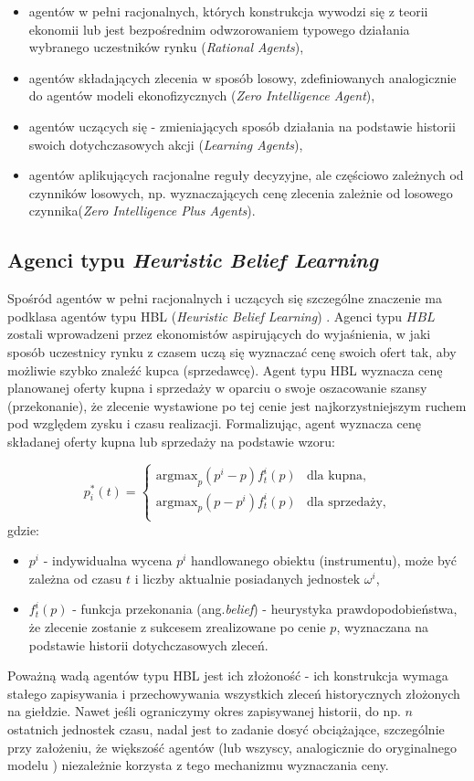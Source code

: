 {\begin{itemize} 
\item agentów w pełni racjonalnych, których konstrukcja wywodzi się z teorii ekonomii lub jest bezpośrednim odwzorowaniem typowego działania wybranego uczestników rynku (\textit{Rational Agents}),
\item agentów składających zlecenia w sposób losowy, zdefiniowanych analogicznie do agentów modeli ekonofizycznych (\textit{Zero Intelligence Agent}),
\item agentów uczących się - zmieniających sposób działania na podstawie historii swoich dotychczasowych akcji (\textit{Learning Agents}), 
\item agentów aplikujących racjonalne reguły decyzyjne, ale częściowo zależnych od czynników losowych, np. wyznaczających cenę zlecenia zależnie od losowego czynnika(\textit{Zero Intelligence Plus Agents}).
\end{itemize} 
\subsection{Agenci typu \textit{Heuristic Belief Learning}}
Spośród agentów w pełni racjonalnych i uczących się szczególne znaczenie ma podklasa agentów typu HBL (\textit{Heuristic Belief Learning}) \cite{hblagent}. Agenci typu $HBL$ zostali wprowadzeni przez ekonomistów aspirujących do wyjaśnienia, w jaki sposób uczestnicy rynku z czasem uczą się wyznaczać cenę swoich ofert tak, aby możliwie szybko znaleźć kupca (sprzedawcę). Agent typu HBL wyznacza cenę planowanej oferty kupna i sprzedaży w oparciu o swoje oszacowanie szansy (przekonanie), że zlecenie wystawione po tej cenie jest najkorzystniejszym ruchem pod względem zysku i czasu realizacji. Formalizując, agent wyznacza cenę składanej oferty kupna lub sprzedaży na podstawie wzoru: 

$$p^*_i(t)= \left\{\begin{array}{lr}
        \mathrm{argmax}_p (p^i-p)f^i_t(p)& \text{dla kupna,}\\
        \mathrm{argmax}_p (p-p^i)f^i_t(p)& \text{dla sprzedaży,}\\
        \end{array}$$
gdzie:
\begin{itemize}
\item $p^i$ - indywidualna wycena $p^i$ handlowanego obiektu (instrumentu), może być zależna od czasu $t$ i liczby aktualnie posiadanych jednostek $\omega^i$, 
\item $f^i_t(p)$ - funkcja przekonania (ang.\textit{belief}) -  heurystyka prawdopodobieństwa, że zlecenie zostanie z sukcesem zrealizowane po cenie $p$, wyznaczana na podstawie historii dotychczasowych zleceń. 
\end{itemize}
Poważną wadą agentów typu HBL jest ich złożoność - ich konstrukcja wymaga stałego zapisywania i przechowywania wszystkich zleceń historycznych złożonych na giełdzie. Nawet jeśli ograniczymy okres zapisywanej historii, do np. $n$ ostatnich jednostek czasu, nadal jest to zadanie dosyć obciążające, szczególnie przy założeniu, że większość agentów (lub wszyscy, analogicznie do oryginalnego modelu \cite{hblagent}) niezależnie korzysta z tego mechanizmu wyznaczania ceny.
}
